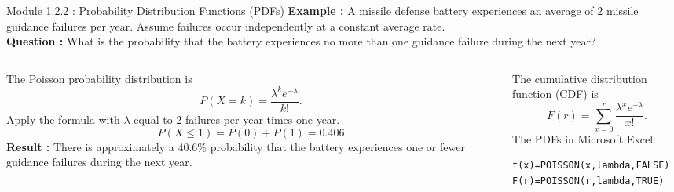 \documentclass{beamer}
\begin{document}
\begin{frame}[fragile]{Module 1.2.2 : Probability Distribution Functions (PDFs)}
\scriptsize
\textbf{Example : } A missile defense battery experiences an average of $2$ missile guidance failures per year. Assume failures occur independently at a constant average rate. \\ \vspace{0.25cm}
\textbf{Question : } What is the probability that the battery experiences no more than one guidance failure during the next year? \\ \vspace{0.5cm}
\begin{columns}
\begin{column}{0.58\textwidth}
\scriptsize
The Poisson probability distribution is
\begin{equation}
P(X=k)=
\frac{\lambda^k e^{-\lambda}}{k!}.
\end{equation}
Apply the formula with $\lambda$ equal to 2 failures per year times one year.
\begin{equation}
P(X\le1) = P(0)+P(1) = 0.406
\end{equation}
\textbf{Result : } There is approximately a $40.6$\% probability that the battery experiences one or fewer guidance failures during the next year.
\end{column}
\begin{column}{0.42\textwidth}
\scriptsize
The cumulative distribution function (CDF) is
\begin{equation}
F(r) = \sum_{x=0}^{r}\frac{\lambda^x e^{-\lambda}}{x!}.
\end{equation}
\vspace{0.25cm}
The PDFs in Microsoft Excel:
\begin{verbatim}
f(x)=POISSON(x,lambda,FALSE)
F(r)=POISSON(r,lambda,TRUE)
\end{verbatim}
\end{column}
\end{columns}
\end{frame}
\end{document}

